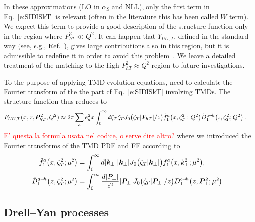 \documentclass[aps,preprintnumbers,showpacs,nofootinbib,superscriptaddress,floatfix]{revtex4}
\newcommand{\smarrow}{\mbox{\raisebox{-4.5pt}[0pt][0pt]{$\hspace{-1pt} 
		\vec{\phantom{v}}$}}}
\newcommand{\T}{\perp}
\newcommand{\Tperp}{T}
\newcommand{\bT}{\zeta_T}
\begin{document}
In these approximations (LO in $\alpha_S$ and NLL), only the first term in
Eq.~\eqref{e:SIDISkT} is relevant (often in the
literature this has been called $W$ term). We expect this term to provide a
good description of the
structure function only in the region where $P_{hT}^2 \ll Q^2$. 
It can happen that $Y_{UU,T}$, defined
in the standard way (see, e.g., Ref.~\cite{Collins:1984kg}), gives large
contributions also in this region, but it is admissible to
redefine it in order to avoid this problem~\cite{Collins:2016hqq}. 
We leave a detailed treatment of the matching to the high $P_{hT}^2 \approx Q^2$
region to future investigations.   

To the purpose of applying TMD evolution equations, 
 need to calculate the Fourier transform of the the part of 
Eq.~\eqref{e:SIDISkT} involving TMDs. The structure function thus reduces to 
\begin{align}
\label{e:SIDISkTFF}
   F_{UU,T}(x,z, \bm{P}_{h \Tperp}^2, Q^2) &\approx 2\pi \sum_a e_a^2 x 
       \int_0^{\infty} {d \bT} \bT J_0\big(\bT |\bm{P}_{hT}|/z\big)
      \tilde{f}_1^a\big(x, \bT^2:Q^2\big) \tilde{D}_1^{a\smarrow h}\big(z, \bT^2;
      Q^2 \big) 
\nonumber \, .
\end{align} 
\textcolor{red}{ E' questa la formula usata nel codice, o serve dire altro?}
where we introduced the Fourier transforms of the TMD PDF and FF according to
\begin{align} 
\tilde{f}_1^a\big(x, \bT^2;\mu^2\big) &=
\int_0^{\infty} d |\bm{k}_\T| 
                |\bm{k}_\T|J_0\big(\bT |\bm{k}_\T|\big) 
       f_1^a\big(x, \bm{k}_\T^2;\mu^2\big),
\\
\tilde{D}_1^{a\smarrow h}\big(z, \bT^2; \mu^2 \big) &=
\int_0^{\infty} \frac{d |\bm{P}_{\T}|}{z^2} |\bm{P}_{\T}| 
                                             J_0\big(\bT |\bm{P}_{\T}|/z\big)
       D_1^{a\smarrow h}\big(z, \bm{P}_{\T}^2; \mu^2 \big).
\end{align}  


\subsection{Drell--Yan processes}
\label{ss:DY_formalism}
\end{document}
